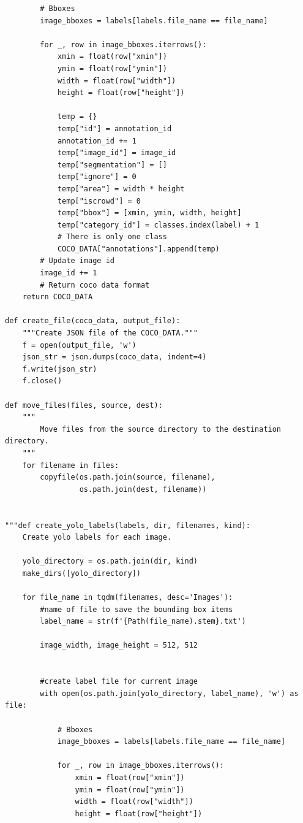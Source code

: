 \documentclass[12pt]{report}
\begin{document}
\begin{lstlisting}
        # Bboxes
        image_bboxes = labels[labels.file_name == file_name]

        for _, row in image_bboxes.iterrows():
            xmin = float(row["xmin"])
            ymin = float(row["ymin"])
            width = float(row["width"])
            height = float(row["height"])

            temp = {}
            temp["id"] = annotation_id
            annotation_id += 1
            temp["image_id"] = image_id
            temp["segmentation"] = []
            temp["ignore"] = 0
            temp["area"] = width * height
            temp["iscrowd"] = 0
            temp["bbox"] = [xmin, ymin, width, height]
            temp["category_id"] = classes.index(label) + 1 
            # There is only one class
            COCO_DATA["annotations"].append(temp)
        # Update image id
        image_id += 1
        # Return coco data format
    return COCO_DATA

def create_file(coco_data, output_file):
    """Create JSON file of the COCO_DATA."""
    f = open(output_file, 'w')
    json_str = json.dumps(coco_data, indent=4)
    f.write(json_str)
    f.close()
    
def move_files(files, source, dest):
    """
        Move files from the source directory to the destination directory.
    """
    for filename in files:
        copyfile(os.path.join(source, filename),
                 os.path.join(dest, filename))
      
        
"""def create_yolo_labels(labels, dir, filenames, kind):
    Create yolo labels for each image.
  
    yolo_directory = os.path.join(dir, kind)
    make_dirs([yolo_directory])
    
    for file_name in tqdm(filenames, desc='Images'):
        #name of file to save the bounding box items
        label_name = str(f'{Path(file_name).stem}.txt')
        
        image_width, image_height = 512, 512
        

        #create label file for current image
        with open(os.path.join(yolo_directory, label_name), 'w') as file:

            # Bboxes
            image_bboxes = labels[labels.file_name == file_name]
            
            for _, row in image_bboxes.iterrows():
                xmin = float(row["xmin"])
                ymin = float(row["ymin"])
                width = float(row["width"])
                height = float(row["height"])
            

\end{lstlisting}
\end{document}

